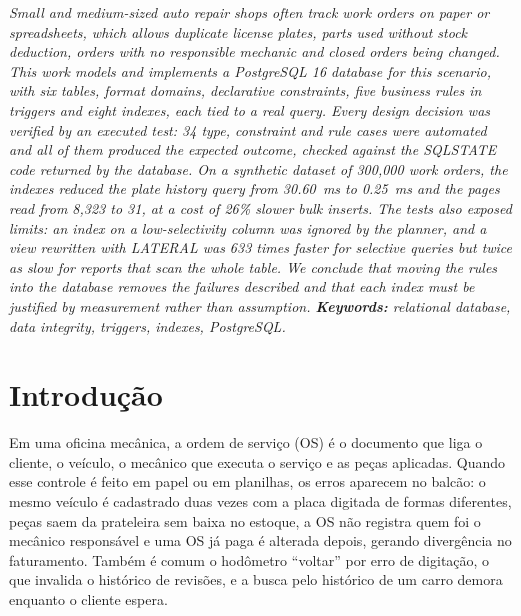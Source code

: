 \documentclass[a4paper,12pt]{article}
\renewenvironment{abstract}{%
  \list{}{\advance\topsep by6pt\relax
    \leftmargin=0.8cm
    \labelwidth=0pt
    \listparindent=0pt
    \itemindent\listparindent
    \rightmargin\leftmargin}\item[\hskip\labelsep\bfseries\itshape Abstract.]\itshape}%
  {\endlist}
\begin{document}
\vspace{6pt}

\begin{abstract}
Small and medium-sized auto repair shops often track work orders on
paper or spreadsheets, which allows duplicate license plates, parts used
without stock deduction, orders with no responsible mechanic and closed
orders being changed. This work models and implements a PostgreSQL 16
database for this scenario, with six tables, format domains, declarative
constraints, five business rules in triggers and eight indexes, each
tied to a real query. Every design decision was verified by an executed
test: 34 type, constraint and rule cases were automated and all of them
produced the expected outcome, checked against the SQLSTATE code
returned by the database. On a synthetic dataset of 300,000 work orders,
the indexes reduced the plate history query from 30.60~ms to 0.25~ms and
the pages read from 8,323 to 31, at a cost of 26\% slower bulk inserts.
The tests also exposed limits: an index on a low-selectivity column was
ignored by the planner, and a view rewritten with \emph{LATERAL} was 633
times faster for selective queries but twice as slow for reports that
scan the whole table. We conclude that moving the rules into the
database removes the failures described and that each index must be
justified by measurement rather than assumption.
\end{abstract}
\noindent\textbf{Keywords:} relational database, data integrity, triggers, indexes, PostgreSQL.

\vspace{18pt}

\section{Introdução}

Em uma oficina mecânica, a ordem de serviço (OS) é o documento que liga
o cliente, o veículo, o mecânico que executa o serviço e as peças
aplicadas. Quando esse controle é feito em papel ou em planilhas, os
erros aparecem no balcão: o mesmo veículo é cadastrado duas vezes com a
placa digitada de formas diferentes, peças saem da prateleira sem baixa
no estoque, a OS não registra quem foi o mecânico responsável e uma OS
já paga é alterada depois, gerando divergência no faturamento. Também é
comum o hodômetro ``voltar'' por erro de digitação, o que invalida o
histórico de revisões, e a busca pelo histórico de um carro demora
enquanto o cliente espera.
\end{document}
